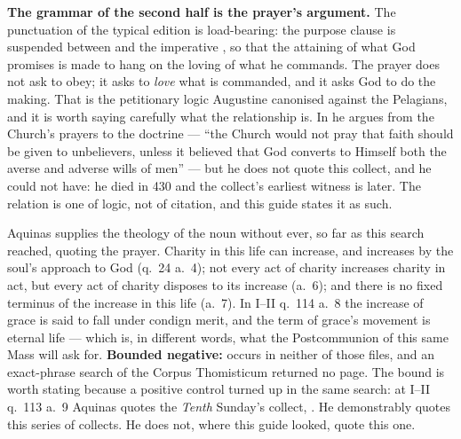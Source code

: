 \textbf{The grammar of the second half is the prayer's argument.} The
punctuation of the typical edition is load-bearing: the purpose clause
 is suspended between  and
the imperative , so that the attaining of
what God promises is made to hang on the loving of what he commands. The
prayer does not ask to obey; it asks to \textit{love} what is commanded, and
it asks God to do the making. That is the petitionary logic Augustine
canonised against the Pelagians, and it is worth saying carefully what the
relationship is. In  he argues from the Church's
prayers to the doctrine --- ``the Church would not pray that faith should be
given to unbelievers, unless it believed that God converts to Himself both the
averse and adverse wills of men'' --- but he does not quote this collect, and
he could not have: he died in 430 and the collect's earliest witness is later.
The relation is one of logic, not of citation, and this guide states it as
such.

\begin{witnessnote}
Aquinas supplies the theology of the noun without ever, so far as this search
reached, quoting the prayer. Charity in this life can increase, and increases
by the soul's approach to God (q.~24 a.~4); not every act of charity increases
charity in act, but every act of charity disposes to its increase (a.~6);
and there is no fixed terminus of the increase in this life (a.~7). In I--II
q.~114 a.~8 the increase of grace is said to fall under condign merit, and the
term of grace's movement is eternal life --- which is, in different words, what
the Postcommunion of this same Mass will ask for. \textbf{Bounded negative:}
 occurs in neither of those files, and an
exact-phrase search of the Corpus Thomisticum returned no page. The bound is
worth stating because a positive control turned up in the same search: at
I--II q.~113 a.~9 Aquinas quotes the \textit{Tenth} Sunday's collect,
.
He demonstrably quotes this series of collects. He does not, where this guide
looked, quote this one.
\end{witnessnote}

